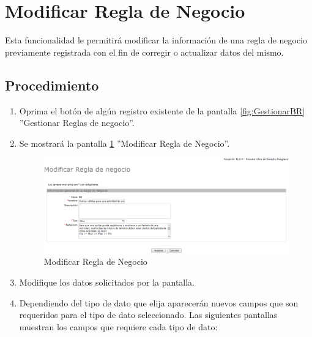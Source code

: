\hypertarget{cv:modificarBR}{\section{Modificar Regla de Negocio}} \label{sec:modificarBR}

	Esta funcionalidad le permitirá modificar la información de una regla de negocio previamente registrada con el fin de corregir o actualizar datos del mismo. 

		\subsection{Procedimiento}

			\begin{enumerate}
	
			\item Oprima el botón \IUEditar{} de algún registro existente de la pantalla \ref{fig:GestionarBR} ''Gestionar Reglas de negocio''.
	
			\item Se mostrará la pantalla \ref{fig:modificarBR} ''Modificar Regla de Negocio''.
			
			\begin{figure}[htbp!]
				\begin{center}
					\includegraphics[scale=0.5]{roles/lider/reglasNegocio/pantallas/IU8-2modificarBR}
					\caption{Modificar Regla de Negocio}
					\label{fig:modificarBR}
				\end{center}
			\end{figure}
		
			\item Modifique los datos solicitados por la pantalla.
			
			\item Dependiendo del tipo de dato que elija aparecerán nuevos campos que son requeridos para el tipo de dato seleccionado. Las siguientes pantallas muestran los campos que requiere cada tipo de dato:
			

\end{enumerate}
